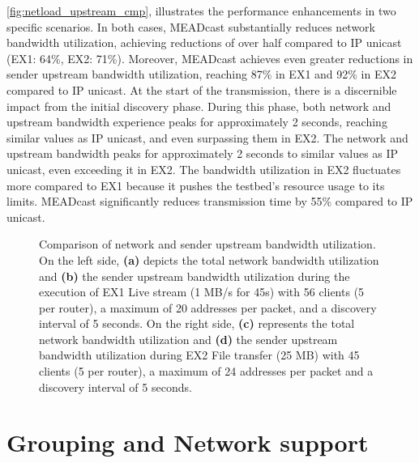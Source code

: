 \autoref{fig:netload_upstream_cmp}, illustrates the performance enhancements in
    two specific scenarios.
In both cases, MEADcast substantially reduces network bandwidth utilization,
    achieving reductions of over half compared to IP unicast (EX1: 64\%, EX2:
    71\%).
Moreover, MEADcast achieves even greater reductions in sender upstream
    bandwidth utilization, reaching 87\% in EX1 and 92\% in EX2 compared to IP
    unicast.
At the start of the transmission, there is a discernible impact from the
    initial discovery phase.
During this phase, both network and upstream bandwidth experience peaks for
    approximately 2 seconds, reaching similar values as IP unicast, and even
    surpassing them in EX2.
The network and upstream bandwidth peaks for approximately 2 seconds to similar
    values as IP unicast, even exceeding it in EX2.
The bandwidth utilization in EX2 fluctuates more compared to EX1 because it
    pushes the testbed's resource usage to its limits.
MEADcast significantly reduces transmission time by 55\% compared to IP unicast.
\begin{figure}
    \begin{center}
        
    \end{center}
    \label{fig:netload_upstream_cmp}
    \caption[Comparison of network and sender upstream bandwidth utilization]{
        Comparison of network and sender upstream bandwidth utilization.
        On the left side, \textbf{(a)} depicts the total network bandwidth
        utilization and \textbf{(b)} the sender upstream bandwidth utilization
        during the execution of EX1 Live stream (1 MB/s for 45s) with 56 clients
        (5 per router), a maximum of 20 addresses per packet, and a discovery
        interval of 5 seconds.
        On the right side, \textbf{(c)} represents the total network bandwidth
        utilization and \textbf{(d)} the sender upstream bandwidth utilization
        during EX2 File transfer (25 MB) with 45 clients (5 per router), a
        maximum of 24 addresses per packet and a discovery interval of 5
        seconds.
    }
\end{figure}



\section{Grouping and Network support} %
\label{sec:Grouping and Network support}

